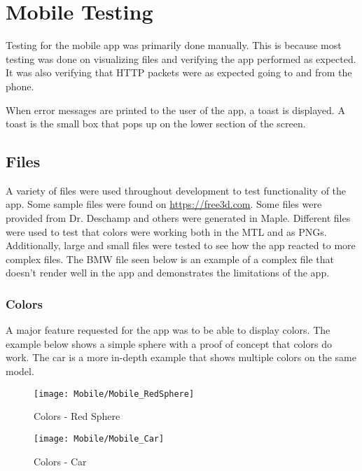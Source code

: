 
\section{Mobile Testing}
    Testing for the mobile app was primarily done manually. This is because most testing was done on visualizing files and verifying the app performed as expected.  It was also verifying that HTTP packets were as expected going to and from the phone.

    When error messages are printed to the user of the app, a toast is displayed.  A toast is the small box that pops up on the lower section of the screen.

    \subsection{Files}
        A variety of files were used throughout development to test functionality of the app. Some sample files were found on \url{https://free3d.com}. Some files were provided from Dr. Deschamp and others were generated in Maple. Different files were used to test that colors were working both in the MTL and as PNGs. Additionally, large and small files were tested to see how the app reacted to more complex files. The BMW file seen below is an example of a complex file that doesn't render well in the app and demonstrates the limitations of the app.
        
        \subsubsection{Colors}
        
            A major feature requested for the app was to be able to display colors. The example below shows a simple sphere with a proof of concept that colors do work. The car is a more in-depth example that shows multiple colors on the same model.
            
            \begin{figure}[H]
                \texttt{[image: Mobile/Mobile\_RedSphere]}
                \centering
                \caption{Colors - Red Sphere}
                \label{fig:mobileRedSphere}
            \end{figure}

            \begin{figure}[H]
                \texttt{[image: Mobile/Mobile\_Car]}
                \centering
                \caption{Colors - Car}
                \label{fig:mobileCar}
            \end{figure}
        
